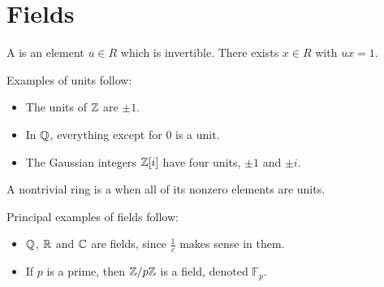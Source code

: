 \documentclass[11pt]{scrreport}
\begin{document}
\section{Fields}
\begin{definition}
    A  is an element $u\in R$ which is invertible. There exists $x\in R$ with $ux = 1$.
\end{definition}
\begin{example}
    Examples of units follow:
    \begin{itemize}
        \item The units of $\mathbb Z$ are $\pm 1$. 
        \item In $\mathbb Q$, everything except for $0$ is a unit.
        \item The Gaussian integers $\mathbb Z[i]$ have four units, $\pm 1$ and $\pm i$.
    \end{itemize}
\end{example}
\begin{definition}
    A nontrivial ring is a  when all of its nonzero elements are units.
\end{definition}
\begin{example}
    Principal examples of fields follow:
    \begin{itemize}
        \item $\mathbb Q$, $\mathbb R$ and $\mathbb C$ are fields, since $\frac{1}{c}$ makes sense in them.
        \item If $p$ is a prime, then $\mathbb Z/p\mathbb Z$ is a field, denoted $\mathbb{F}_p$.
    \end{itemize}
\end{example}
\end{document}
